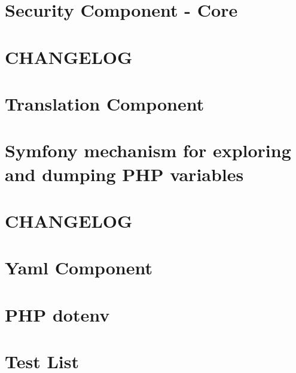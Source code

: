\documentclass[twoside]{book}
\newcommand{\+}{\discretionary{\mbox{\scriptsize$\hookleftarrow$}}{}{}}
\begin{document}
\chapter{Security Component -\/ Core}
\label{md_vendor_symfony_security-core__symfony__component__security__core__r_e_a_d_m_e}

\chapter{C\+H\+A\+N\+G\+E\+L\+O\+G}
\label{md_vendor_symfony_translation__symfony__component__translation__c_h_a_n_g_e_l_o_g}

\chapter{Translation Component}
\label{md_vendor_symfony_translation__symfony__component__translation__r_e_a_d_m_e}

\chapter{Symfony mechanism for exploring and dumping P\+H\+P variables}
\label{md_vendor_symfony_var-dumper__symfony__component__var_dumper__r_e_a_d_m_e}

\chapter{C\+H\+A\+N\+G\+E\+L\+O\+G}
\label{md_vendor_symfony_yaml__symfony__component__yaml__c_h_a_n_g_e_l_o_g}

\chapter{Yaml Component}
\label{md_vendor_symfony_yaml__symfony__component__yaml__r_e_a_d_m_e}

\chapter{P\+H\+P dotenv}
\label{md_vendor_vlucas_phpdotenv__r_e_a_d_m_e}

\chapter{Test List}
\label{test}

\end{document}

